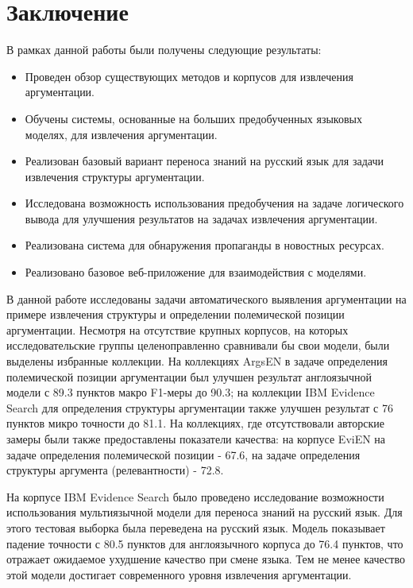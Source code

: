 \section{Заключение}

В рамках данной работы были получены следующие результаты:
\begin{itemize}
    \item Проведен обзор существующих методов и корпусов для извлечения аргументации.
    \item Обучены системы, основанные на больших предобученных языковых моделях, для извлечения аргументации.
    \item Реализован базовый вариант переноса знаний на русский язык для задачи извлечения структуры аргументации.
    \item Исследована возможность использования предобучения на задаче логического вывода для улучшения результатов на задачах извлечения аргументации.
    \item Реализована система для обнаружения пропаганды в новостных ресурсах.
    \item Реализовано базовое веб-приложение для взаимодействия с моделями.
\end{itemize}

В данной работе исследованы задачи автоматического выявления аргументации на примере извлечения структуры и определении полемической позиции аргументации. Несмотря на отсутствие крупных корпусов, на которых исследовательские группы целеноправленно сравнивали бы свои модели, были выделены избранные коллекции. На коллекциях ArgsEN \cite{toledo2020multilingual} в задаче определения полемической позиции аргументации был улучшен результат англоязычной модели с 89.3 пунктов макро F1-меры до 90.3; на коллекции IBM Evidence Search \cite{shnarch2018will} для определения структуры аргументации также улучшен результат с 76 пунктов микро точности до 81.1. На коллекциях, где отсутствовали авторские замеры были также предоставлены показатели качества: на корпусе EviEN на задаче определения полемической позиции - 67.6, на задаче определения структуры аргумента (релевантности) - 72.8.

На корпусе IBM Evidence Search было проведено исследование возможности использования мультиязычной модели для переноса знаний на русский язык. Для этого тестовая выборка была переведена на русский язык. Модель показывает падение точности с 80.5 пунктов для англоязычного корпуса до 76.4 пунктов, что отражает ожидаемое ухудшение качество при смене языка. Тем не менее качество этой модели достигает современного уровня извлечения аргументации. 

